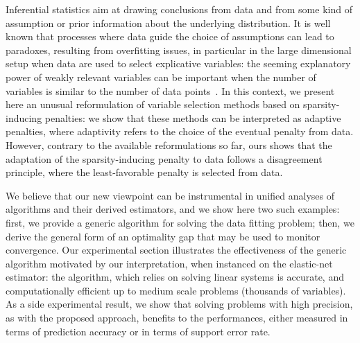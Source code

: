 Inferential statistics aim at drawing conclusions from data and from some kind
of assumption or prior information about the underlying distribution.  It is
well known that processes where data guide the choice of assumptions can lead to
paradoxes, resulting from overfitting issues, in particular in the large
dimensional setup when data are used to select explicative variables: the
seeming explanatory power of weakly relevant variables can be important when the
number of variables is similar to the number of data
points~\citep{Freedman83b,Ambroise02}.
In this context, we present here an unusual reformulation of variable selection
methods based on sparsity-inducing penalties: we show that these methods can be
interpreted as adaptive penalties, where adaptivity refers to the choice of the
eventual penalty from data.
However, contrary to the available reformulations so far, ours shows that the adaptation
of the sparsity-inducing penalty to data follows a disagreement principle, where
the least-favorable penalty is selected from data.

We believe that our new viewpoint can be instrumental in unified analyses of
algorithms and their derived estimators, and we show here two such examples:
first, we provide a generic algorithm for solving the data fitting problem;
then, we derive the general form of an optimality gap that may be used to
monitor convergence.
Our experimental section illustrates the effectiveness of the generic algorithm
motivated by our interpretation, when instanced on the elastic-net estimator:
the algorithm, which relies on solving linear systems
is accurate, and computationally efficient up to medium scale problems (thousands of
variables).
As a side experimental result, we show that solving problems with high
precision, as with the proposed approach, benefits to the performances, either
measured in terms of prediction accuracy or in terms of support error rate.




